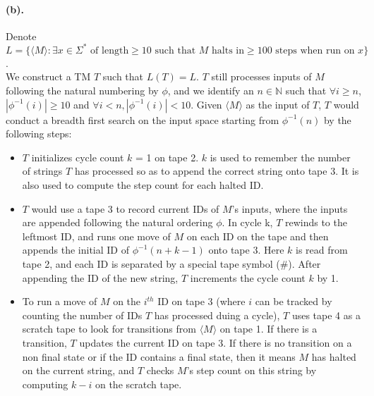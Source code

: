 \documentclass[12pt]{article}
\begin{document}
\paragraph*{(b).} Denote \(L = \{\langle M \rangle : \exists x \in \Sigma^* \text{ of length} \geq 10 \text{ such that } M \text{ halts in} \geq 100 \text{ steps when run on } x\}\).\\
We construct a TM \(T\) such that \(L(T) = L\). \(T\) still processes inputs of \(M\) following the natural numbering by \(\phi\), and we identify an \(n \in \mathbb{N}\) such that \(\forall i \geq n\), \( |\phi^{-1}(i)| \geq 10\) and \(\forall i < n, |\phi^{-1}(i)| < 10\). Given \(\langle M \rangle\) as the input of \(T\), \(T\) would conduct a breadth first search on the input space starting from \(\phi^{-1}(n)\) by the following steps:
\begin{itemize}
  \item \(T\) initializes cycle count \(k\) = 1 on tape 2. \(k\) is used to remember the number of strings \(T\) has processed so as to append the correct string onto tape 3. It is also used to compute the step count for each halted ID.
  \item \(T\) would use a tape 3 to record current IDs of \(M\)'s inputs, where the inputs are appended following the natural ordering \(\phi\). In cycle k, \(T\) rewinds to the leftmost ID, and runs one move of \(M\) on each ID on the tape and then appends the initial ID of \(\phi^{-1}(n+k-1)\) onto tape 3. Here \(k\) is read from tape 2, and each ID is separated by a special tape symbol (\#). After appending the ID of the new string, \(T\) increments the cycle count \(k\) by 1.
  \item To run a move of \(M\) on the \(i^{th}\) ID on tape 3 (where \(i\) can be tracked by counting the number of IDs \(T\) has processed duing a cycle), \(T\) uses tape 4 as a scratch tape to look for transitions from \(\langle M \rangle\) on tape 1. If there is a transition, \(T\) updates the current ID on tape 3. If there is no transition on a non final state or if the ID contains a final state, then it means \(M\) has halted on the current string, and \(T\) checks \(M\)'s step count on this string by computing \(k - i\) on the scratch tape.

\end{itemize}
\end{document}
